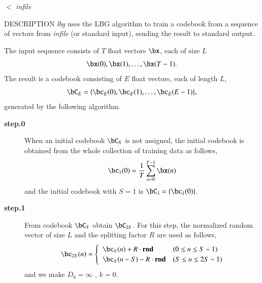 \begin{synopsis}
\item [lbg] [ --l $L$ ] [ --n $N$ ] [ --t $T$ ] [ --s $S$ ] [ --e $E$ ]
        [ --F $F$ ] [ --i $I$ ] [ --m $M$ ] [ --S $s$ ] 
\item [\ ~~~~~] [ --c $C$ ] [ --d $D$ ] [ --r $R$ ] [ {\em indexfile} ] $<$ {\em infile}
\end{synopsis}

\begin{qsection}{DESCRIPTION}
{\em lbg} uses the LBG algorithm to train a codebook 
from a sequence of vectors from {\em infile} (or standard input), 
sending the result to standard output.

The input sequence consists of $T$ float vectors $\bx$, 
each of size $L$
\begin{displaymath} 
\bx(0), \bx(1), \dots, \bx(T-1). 
\end{displaymath}
The result is a codebook consisting of $E$ float vectors, 
each of length $L$,
\begin{displaymath}
\bC_E =\{ \bc_E(0), \bc_E(1), \dots, \bc_E(E-1) \}, 
\end{displaymath}
generated by the following algorithm.

\begin{description}
\item[\bf step.0~~~]
When an initial codebook $\bC_S$ is not assigned,
the initial codebook is obtained from the whole collection of
training data as follows,
\begin{displaymath}
\bc_1(0) = \frac{1}{T} \sum_{n=0}^{T-1} \bx(n)
\end{displaymath}
and the initial codebook with $S = 1$ is $\bC_1 = \{ \bc_1(0) \}$.

\item[\bf step.1~~~]
From codebook $\bC_{S}$ obtain $\bC_{2S}$.
For this step, the normalized random vector of size $L$ and the splitting factor
$R$ are used as follows,
\begin{displaymath}
\bc_{2S}(n)= \begin{cases}
\;\;\bc_S(n) + R \cdot \bm{\mathrm{rnd}} & ( 0 \le n \le S-1 ) \\
\;\;\bc_S(n-S) - R \cdot \bm{\mathrm{rnd}} & ( S \le n \le 2S-1 )
\end{cases}
\end{displaymath}
and we make $D_0 = \infty$ , $k = 0$.


\end{description}
\end{qsection}
